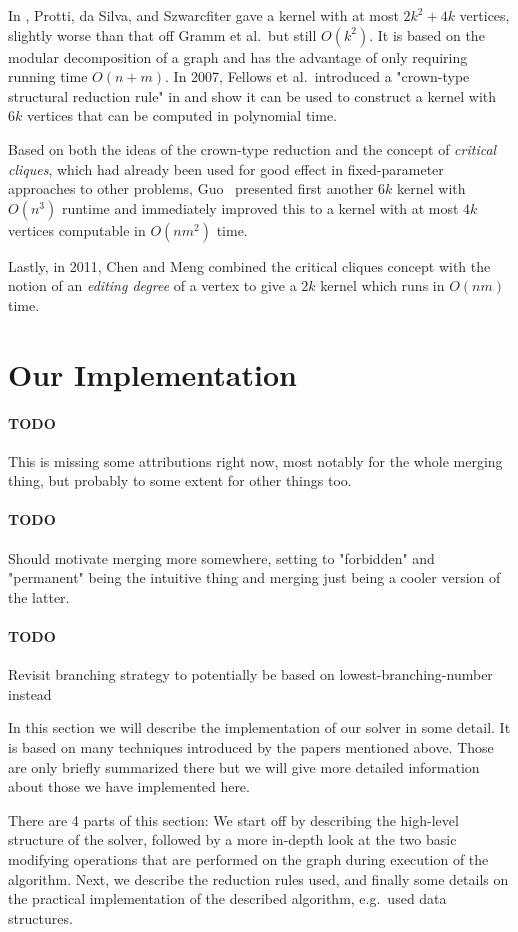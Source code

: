 \documentclass{article}
\newcommand{\todo}[1]{\paragraph{TODO} #1}
\begin{document}
In \cite[2006]{Protti}, Protti, da Silva, and Szwarcfiter gave a kernel with at most $2k^2 + 4k$
vertices, slightly worse than that off Gramm et al.\ but still $O(k^2)$. It is based on the modular
decomposition of a graph and has the advantage of only requiring running time $O(n + m)$. In 2007,
Fellows et al.\ introduced a "crown-type structural reduction rule" in \cite{Fellows} and show it
can be used to construct a kernel with $6k$ vertices that can be computed in polynomial time.

Based on both the ideas of the crown-type reduction and the concept of \emph{critical cliques},
which had already been used for good effect in fixed-parameter approaches to other problems,
Guo~\cite{Guo} presented first another $6k$ kernel with $O(n^3)$ runtime and immediately improved
this to a kernel with at most $4k$ vertices computable in $O(nm^2)$ time.

Lastly, in 2011, Chen and Meng \cite{ChenMeng} combined the critical cliques concept with the notion
of an \emph{editing degree} of a vertex to give a $2k$ kernel which runs in $O(nm)$ time.

\section{Our Implementation}

\todo This is missing some attributions right now, most notably for the whole merging thing, but
probably to some extent for other things too.

\todo Should motivate merging more somewhere, setting to "forbidden" and "permanent" being the
intuitive thing and merging just being a cooler version of the latter.

\todo Revisit branching strategy to potentially be based on lowest-branching-number instead

In this section we will describe the implementation of our solver in some detail. It is based on
many techniques introduced by the papers mentioned above. Those are only briefly summarized there
but we will give more detailed information about those we have implemented here.

There are 4 parts of this section: We start off by describing the high-level structure of the
solver, followed by a more in-depth look at the two basic modifying operations that are performed on
the graph during execution of the algorithm. Next, we describe the reduction rules used, and finally
some details on the practical implementation of the described algorithm, e.g.\ used data structures.
\end{document}
